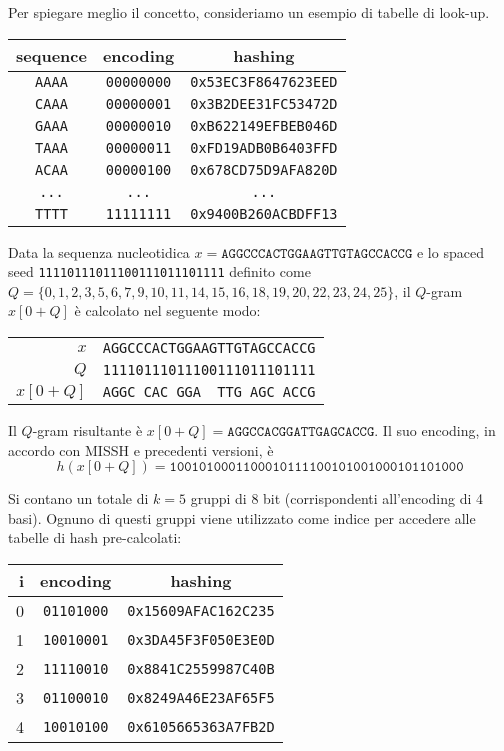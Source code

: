 \begin{example}
	Per spiegare meglio il concetto, consideriamo un esempio di tabelle di look-up. 
	\begin{center}
		\begin{tabular}{c c c}
			\textbf{sequence} & \textbf{encoding} & \textbf{hashing} \\
			\toprule
			\verb|AAAA| & \verb|00000000| & \verb|0x53EC3F8647623EED| \\
			\verb|CAAA| & \verb|00000001| & \verb|0x3B2DEE31FC53472D| \\
			\verb|GAAA| & \verb|00000010| & \verb|0xB622149EFBEB046D| \\
			\verb|TAAA| & \verb|00000011| & \verb|0xFD19ADB0B6403FFD| \\
			\verb|ACAA| & \verb|00000100| & \verb|0x678CD75D9AFA820D| \\
			\verb|...| & \verb|...| & \verb|...| \\
			\verb|TTTT| & \verb|11111111| & \verb|0x9400B260ACBDFF13| \\
			\bottomrule
		\end{tabular}
	\end{center}
	
	Data la sequenza nucleotidica $x = \texttt{AGGCCCACTGGAAGTTGTAGCCACCG}$ e lo spaced seed \verb|11110111011100111011101111| definito come $Q = \{ 0, 1, 2, 3, 5, 6, 7, 9, 10, 11, 14, 15, 16, 18, 19, 20, 22, 23, 24, 25 \}$, il $Q$-gram $x[0 + Q]$ è calcolato nel seguente modo:
	\begin{center}
		\begin{tabular}{r || l}
			$x$ & \texttt{AGGCCCACTGGAAGTTGTAGCCACCG} \\
			$Q$ & \texttt{11110111011100111011101111} \\
			$x[0 + Q]$ & \texttt{AGGC\ CAC\ GGA\ \ TTG\ AGC\ ACCG} \\
		\end{tabular}
	\end{center}
	
	Il $Q$-gram risultante è $x[0 + Q] = \texttt{AGGCCACGGATTGAGCACCG}$. Il suo encoding, in accordo con \acs{MISSH} e precedenti versioni, è \[ h(x[0 + Q]) = \texttt{1001010001100010111100101001000101101000} \]
	
	Si contano un totale di $k = 5$ gruppi di 8 bit (corrispondenti all'encoding di 4 basi). Ognuno di questi gruppi viene utilizzato come indice per accedere alle tabelle di hash pre-calcolati:
	\begin{center}
		\begin{tabular}{r c c}
			\textbf{i} & \textbf{encoding} & \textbf{hashing} \\
			\toprule
			0 & \verb|01101000| & \verb|0x15609AFAC162C235| \\
			1 & \verb|10010001| & \verb|0x3DA45F3F050E3E0D| \\
			2 & \verb|11110010| & \verb|0x8841C2559987C40B| \\
			3 & \verb|01100010| & \verb|0x8249A46E23AF65F5| \\
			4 & \verb|10010100| & \verb|0x6105665363A7FB2D| \\
			\bottomrule
		\end{tabular}
	\end{center}
	

\end{example}

